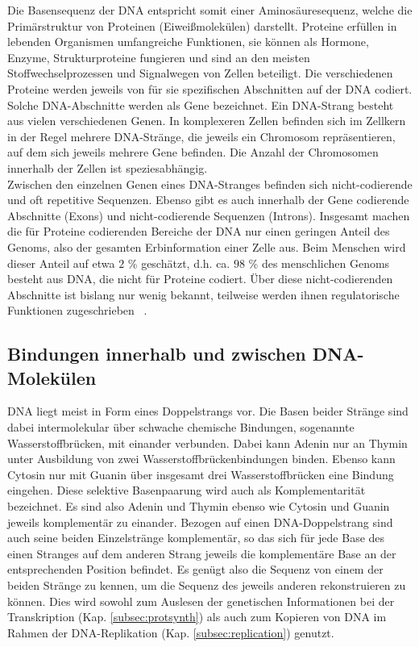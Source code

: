 Die Basensequenz der DNA entspricht somit einer Aminosäuresequenz, welche die Primärstruktur von Proteinen (Eiweißmolekülen) darstellt. Proteine erfüllen in lebenden Organismen umfangreiche Funktionen, sie können als Hormone, Enzyme, Strukturproteine fungieren und sind an den meisten Stoffwechselprozessen und Signalwegen von Zellen beteiligt. Die verschiedenen Proteine werden jeweils von für sie spezifischen Abschnitten auf der DNA codiert. Solche DNA-Abschnitte werden als Gene bezeichnet. Ein DNA-Strang besteht aus vielen verschiedenen Genen. In komplexeren Zellen befinden sich im Zellkern in der Regel mehrere DNA-Stränge, die jeweils ein Chromosom repräsentieren, auf dem sich jeweils mehrere Gene befinden. Die Anzahl der Chromosomen innerhalb der Zellen ist speziesabhängig. \\

Zwischen den einzelnen Genen eines DNA-Stranges befinden sich nicht-codierende und oft repetitive Sequenzen. Ebenso gibt es auch innerhalb der Gene codierende Abschnitte (Exons) und nicht-codierende Sequenzen (Introns). Insgesamt machen die für Proteine codierenden Bereiche der DNA nur einen geringen Anteil des Genoms, also der gesamten Erbinformation einer Zelle aus. Beim Menschen wird dieser Anteil auf etwa $2$ \% geschätzt, d.h. ca. $ 98 $ \% des menschlichen Genoms besteht aus DNA, die nicht für Proteine codiert. Über diese nicht-codierenden Abschnitte ist bislang nur wenig bekannt, teilweise werden ihnen regulatorische Funktionen zugeschrieben ~\cite{dunham_2012, tsagakis_2020}. \\

\subsection{Bindungen innerhalb und zwischen DNA-Molekülen} \label{subsec:double_strand}

DNA liegt meist in Form eines Doppelstrangs vor. Die Basen beider Stränge sind dabei intermolekular über schwache chemische Bindungen, sogenannte Wasserstoffbrücken, mit einander verbunden. Dabei kann Adenin nur an Thymin unter Ausbildung von zwei Wasserstoffbrückenbindungen binden. Ebenso kann Cytosin nur mit Guanin über insgesamt drei Wasserstoffbrücken eine Bindung eingehen. Diese selektive Basenpaarung wird auch als Komplementarität bezeichnet. Es sind also Adenin und Thymin ebenso wie Cytosin und Guanin jeweils komplementär zu einander. Bezogen auf einen DNA-Doppelstrang sind auch seine beiden Einzelstränge komplementär, so das sich für jede Base des einen Stranges auf dem anderen Strang jeweils die komplementäre Base an der entsprechenden Position befindet. Es genügt also die Sequenz von einem der beiden Stränge zu kennen, um die Sequenz des jeweils anderen rekonstruieren zu können. Dies wird sowohl zum Auslesen der genetischen Informationen bei der Transkription (Kap. \ref{subsec:protsynth}) als auch zum Kopieren von DNA im Rahmen der DNA-Replikation (Kap. \ref{subsec:replication}) genutzt. \\

